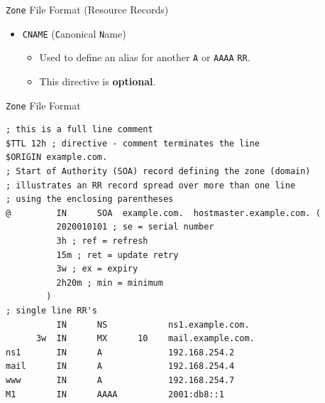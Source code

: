 \documentclass[xcolor=table]{beamer}
\begin{document}
\begin{frame}{\texttt{Zone} File Format (Resource Records)}
  \begin{itemize}
    \item \texttt{CNAME} (\texttt{C}anonical \texttt{N}ame)
       \begin{itemize}
          \item Used to define an alias for another \texttt{A} or \texttt{AAAA} \texttt{RR}.
          \item This directive is \textbf{optional}.
       \end{itemize}
  \end{itemize}
\end{frame}

\begin{frame}[fragile]{\texttt{Zone} File Format}
  \lstset{
    basicstyle=\scriptsize\ttfamily,
  }
  \begin{lstlisting}
; this is a full line comment
$TTL 12h ; directive - comment terminates the line
$ORIGIN example.com.
; Start of Authority (SOA) record defining the zone (domain)
; illustrates an RR record spread over more than one line
; using the enclosing parentheses
@         IN      SOA  example.com.  hostmaster.example.com. (
          2020010101 ; se = serial number
          3h ; ref = refresh
          15m ; ret = update retry
          3w ; ex = expiry
          2h20m ; min = minimum
        )
; single line RR's
          IN      NS            ns1.example.com.
      3w  IN      MX      10    mail.example.com.
ns1       IN      A             192.168.254.2
mail      IN      A             192.168.254.4
www       IN      A             192.168.254.7
M1        IN	  AAAA          2001:db8::1
  \end{lstlisting}
\end{frame}
\end{document}

